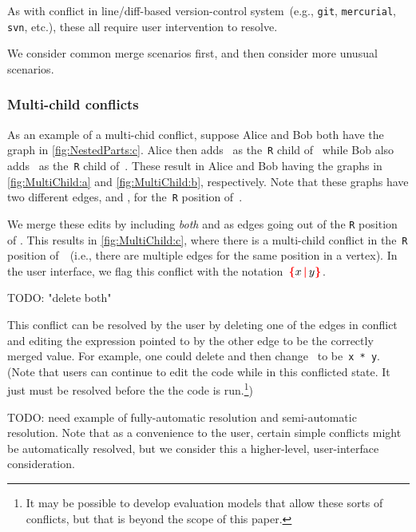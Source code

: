 As with conflict in line/diff-based version-control
system~(e.g., \texttt{git}, \texttt{mercurial}, \texttt{svn}, etc.),
these all require user intervention to resolve.

We consider common merge scenarios first, and then consider more unusual scenarios.

\subsubsection{Multi-child conflicts}%
\label{sub:Multi-child conflicts}

\figureMultiChild{}

As an example of a multi-chid conflict, suppose Alice and Bob both have the graph in \autoref{fig:NestedParts:c}.
Alice then adds~\vMultiChildAlice{} as the~\texttt{R} child of~\vWrapPlus{}
while Bob also adds~\vMultiChildBob{} as the~\texttt{R} child of~\vWrapPlus{}.
These result in Alice and Bob having the graphs in \autoref{fig:MultiChild:a} and \autoref{fig:MultiChild:b}, respectively.
Note that these graphs have two different edges, \eMultiChildAlice{} and \eMultiChildBob{}, for the~\texttt{R} position of~\vWrapPlus{}.

We merge these edits by including \emph{both} \eMultiChildAlice{} and \eMultiChildBob{}
as edges going out of the \texttt{R} position of \vWrapPlus{}.
This results in \autoref{fig:MultiChild:c}, where there is a multi-child conflict
in the~\texttt{R} position of~\vWrapPlus~(i.e., there are multiple edges for the same position in a vertex).
In the user interface, we flag this conflict with the notation~$\conflictHole{x,y}$.

TODO: "delete both"

This conflict can be resolved by the user by deleting
one of the edges in conflict and editing the expression pointed to by the other edge to be the correctly merged value.
For example, one could delete \eMultiChildBob{} and then change~\vMultiChildAlice{} to be~\texttt{x * y}.
(Note that users can continue to edit the code while in this conflicted state.
It just must be resolved before the the code is run.\footnote{It
  may be possible to develop evaluation models that allow these sorts of conflicts,
  but that is beyond the scope of this paper.})

TODO: need example of fully-automatic resolution and semi-automatic resolution.
Note that as a convenience to the user, certain simple
conflicts might be automatically resolved,
but we consider this a higher-level, user-interface consideration.

